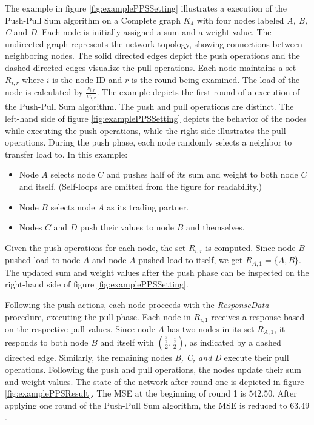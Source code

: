 The example in figure \ref{fig:examplePPSSetting} illustrates a execution of the Push-Pull Sum algorithm on a Complete graph $K_4$ with four nodes labeled \textit{A, B, C} and \textit{D}. Each node is initially assigned a sum and a weight value. The undirected graph represents the network topology, showing connections between neighboring nodes. The solid directed edges depict the push operations and the dashed directed edges visualize the pull operations. Each node maintains a set $R_{i,r}$ where $i$ is the node ID and $r$ is the round being examined. The load of the node is calculated by $\frac{s_{i,r}}{w_{i,r}}$. The example depicts the first round of a execution of the Push-Pull Sum algorithm. The push and pull operations are distinct. The left-hand side of figure \ref{fig:examplePPSSetting} depicts the behavior of the nodes while executing the push operations, while the right side illustrates the pull operations. During the push phase, each node randomly selects a neighbor to transfer load to. In this example:

\begin{itemize}
    \item Node $A$ selects node $C$ and pushes half of its sum and weight to both node $C$ and itself. (Self-loops are omitted from the figure for readability.)
    \item Node $B$ selects node $A$ as its trading partner.
    \item Nodes $C$ and $D$ push their values to node $B$ and themselves.
\end{itemize}

Given the push operations for each node, the set $R_{i,r}$ is computed. Since node $B$ pushed load to node $A$ and node $A$ pushed load to itself, we get $R_{A,1}=\{A,B\}$. The updated sum and weight values after the push phase can be inspected on the right-hand side of figure \ref{fig:examplePPSSetting}.

Following the push actions, each node proceeds with the \textit{ResponseData}-procedure, executing the pull phase. Each node in $R_{i,1}$ receives a response based on the respective pull values. Since node $A$ has two nodes in its set $R_{A,1}$, it responds to both node $B$ and itself with $\left(\frac{\frac{3}{2}}{2}, \frac{\frac{1}{2}}{2}\right)$, as indicated by a dashed directed edge. Similarly, the remaining nodes \textit{B, C, and D} execute their pull operations. Following the push and pull operations, the nodes update their sum and weight values. The state of the network after round one is depicted in figure \ref{fig:examplePPSResult}. The MSE at the beginning of round 1 is $542.50$. After applying one round of the Push-Pull Sum algorithm, the MSE is reduced to $63.49$.

